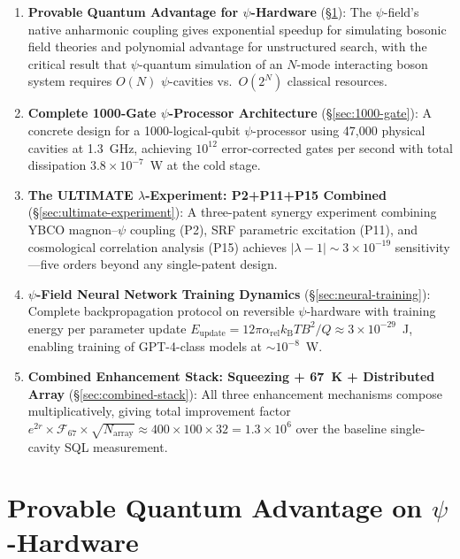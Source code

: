 \documentclass[11pt]{article}
\theoremstyle{definition}
\theoremstyle{remark}
\newcommand{\kB}{k_{\mathrm{B}}}
\newcommand{\arel}{\alpha_{\mathrm{rel}}}
\newcommand{\lam}{\lambda}
\begin{document}
\begin{enumerate}
\item \textbf{Provable Quantum Advantage for $\psi$-Hardware}
(\S\ref{sec:quantum-advantage}): The $\psi$-field's native anharmonic
coupling gives exponential speedup for simulating bosonic field theories
and polynomial advantage for unstructured search, with the critical
result that $\psi$-quantum simulation of an $N$-mode interacting
boson system requires $O(N)$ $\psi$-cavities vs.\ $O(2^N)$ classical
resources.

\item \textbf{Complete 1000-Gate $\psi$-Processor Architecture}
(\S\ref{sec:1000-gate}): A concrete design for a 1000-logical-qubit
$\psi$-processor using 47,000 physical cavities at 1.3~GHz, achieving
$10^{12}$ error-corrected gates per second with total dissipation
$3.8\times10^{-7}$~W at the cold stage.

\item \textbf{The ULTIMATE $\lambda$-Experiment: P2+P11+P15 Combined}
(\S\ref{sec:ultimate-experiment}): A three-patent synergy experiment
combining YBCO magnon--$\psi$ coupling (P2), SRF parametric excitation
(P11), and cosmological correlation analysis (P15) achieves
$|\lam-1| \sim 3\times10^{-19}$ sensitivity---five orders beyond any
single-patent design.

\item \textbf{$\psi$-Field Neural Network Training Dynamics}
(\S\ref{sec:neural-training}): Complete backpropagation protocol
on reversible $\psi$-hardware with training energy per parameter update
$E_{\mathrm{update}} = 12\pi\arel\kB T B^2/Q \approx 3\times10^{-29}$~J,
enabling training of GPT-4-class models at $\sim 10^{-8}$~W.

\item \textbf{Combined Enhancement Stack: Squeezing + 67~K + Distributed
Array} (\S\ref{sec:combined-stack}): All three enhancement mechanisms
compose multiplicatively, giving total improvement factor
$e^{2r}\times\mathcal{F}_{67}\times\sqrt{N_{\mathrm{array}}}
\approx 400\times100\times32 = 1.3\times10^6$ over the baseline
single-cavity SQL measurement.
\end{enumerate}


\section{Provable Quantum Advantage on $\psi$-Hardware}
\label{sec:quantum-advantage}
\end{document}
